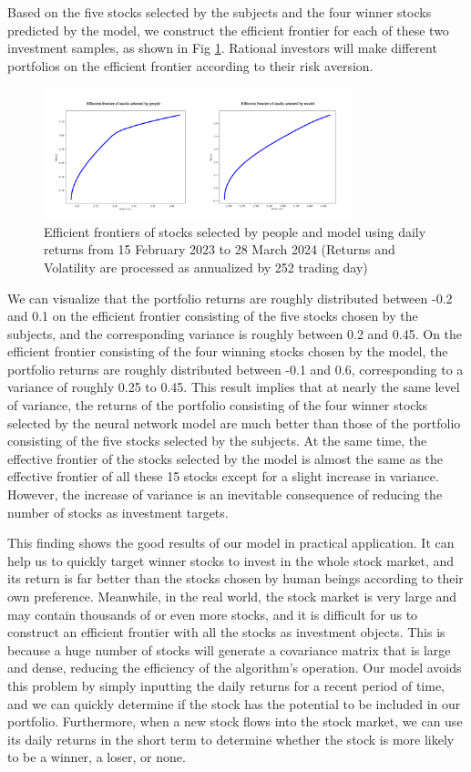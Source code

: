 \documentclass[default,iicol]{sn-jnl}%
\begin{document}
Based on the five stocks selected by the subjects and the four winner stocks predicted by the model, we construct the efficient frontier for each of these two investment samples, as shown in Fig \ref{fg9}. Rational investors will make different portfolios on the efficient frontier according to their risk aversion.
\begin{figure}[htbp]
	\centering    
	\includegraphics[width = 0.8\textwidth]{figures/Fig 9.png}
	\caption{Efficient frontiers of stocks selected by people and model using daily returns from 15 February 2023 to 28 March 2024 (Returns and Volatility are processed as annualized by 252 trading day)}
	\label{fg9}
\end{figure} 

We can visualize that the portfolio returns are roughly distributed between -0.2 and 0.1 on the efficient frontier consisting of the five stocks chosen by the subjects, and the corresponding variance is roughly between 0.2 and 0.45. On the efficient frontier consisting of the four winning stocks chosen by the model, the portfolio returns are roughly distributed between -0.1 and 0.6, corresponding to a variance of roughly 0.25 to 0.45. This result implies that at nearly the same level of variance, the returns of the portfolio consisting of the four winner stocks selected by the neural network model are much better than those of the portfolio consisting of the five stocks selected by the subjects. At the same time, the effective frontier of the stocks selected by the model is almost the same as the effective frontier of all these 15 stocks except for a slight increase in variance. However, the increase of variance is an inevitable consequence of reducing the number of stocks as investment targets.

This finding shows the good results of our model in practical application. It can help us to quickly target winner stocks to invest in the whole stock market, and its return is far better than the stocks chosen by human beings according to their own preference. Meanwhile, in the real world, the stock market is very large and may contain thousands of or even more stocks, and it is difficult for us to construct an efficient frontier with all the stocks as investment objects. This is because a huge number of stocks will generate a covariance matrix that is large and dense, reducing the efficiency of the algorithm's operation. Our model avoids this problem by simply inputting the daily returns for a recent period of time, and we can quickly determine if the stock has the potential to be included in our portfolio. Furthermore, when a new stock flows into the stock market, we can use its daily returns in the short term to determine whether the stock is more likely to be a winner, a loser, or none.
\end{document}
